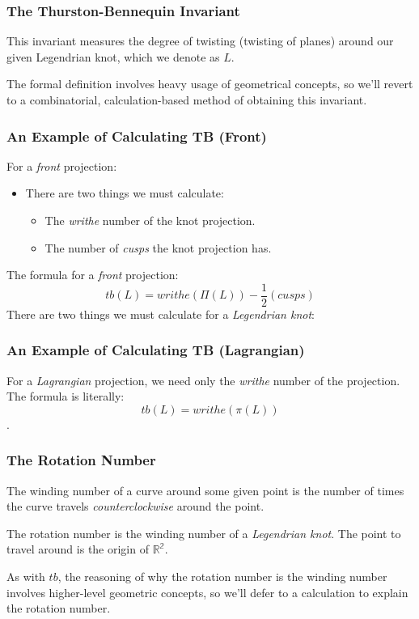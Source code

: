 \documentclass{beamer}
\begin{document}
\begin{frame}
    \frametitle{The Thurston-Bennequin Invariant}
    \begin{definition}
    This invariant measures the degree of twisting (twisting of planes)
    around our given Legendrian knot, which we denote as $L.$
\end{definition}
The formal definition involves heavy usage of geometrical concepts,
so we'll revert to a combinatorial, calculation-based method of
obtaining this invariant.
\end{frame}
\begin{frame}
    \frametitle{An Example of Calculating TB (Front)}
    For a \textit{front} projection:
    \begin{itemize}
        \item There are two things we must calculate:
        \begin{itemize}
            \item The \textit{writhe} number of the knot projection.
            \item The number of \textit{cusps} the knot projection has.
        \end{itemize}
    \end{itemize}
    The formula for a \textit{front} projection:
    \[tb(L) = writhe(\Pi(L)) - \frac{1}{2}(cusps)\]
    There are two things we must calculate for a \textit{Legendrian knot}:
\end{frame}

\begin{frame}
    \frametitle{An Example of Calculating TB (Lagrangian)}
    For a \textit{Lagrangian} projection, we need only the \textit{writhe}
    number of the projection. \\
    The formula is literally:
    \[tb(L) = writhe(\pi(L))\].
\end{frame}

\begin{frame}
    \frametitle{The Rotation Number}
    \begin{definition}
        The \alert{winding number} of a curve around some given point
        is the number of times the curve travels \textit{counterclockwise}
        around the point.
    \end{definition}

    \begin{definition}
        The \alert{rotation number} is the winding number of a \textit{Legendrian
          knot}. The point to travel around is the origin of $\mathbb{R^2}.$
    \end{definition}
    As with $tb$, the reasoning of why the rotation number is the winding
    number involves higher-level geometric concepts, so we'll defer
    to a calculation to explain the rotation number.
\end{frame}
\end{document}
